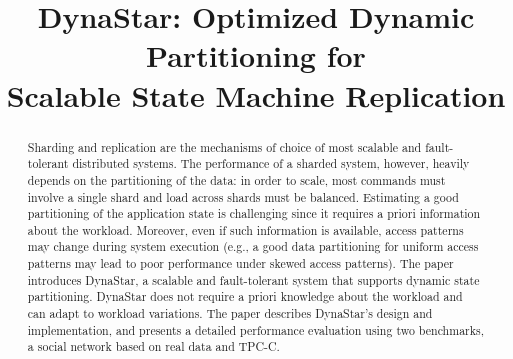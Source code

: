 \documentclass[svgnames,sigplan,10pt]{acmart}
\newcommand{\dynastar}{\mbox{DynaStar}\xspace}
\begin{document}
\title{\dynastar: Optimized Dynamic Partitioning for\\ Scalable State Machine Replication}
\date{}


\begin{abstract}

Sharding and replication are the mechanisms of choice of most scalable and fault-tolerant distributed systems.
The performance of a sharded system, however, heavily depends on the partitioning of the data: in order to scale, most commands must involve a single shard and load across shards must be balanced.
Estimating a good partitioning of the application state is challenging since it requires a priori information about the workload.
Moreover, even if such information is available, access patterns may change during system execution (e.g., a good data partitioning for uniform access patterns may lead to poor performance under skewed access patterns).
The paper introduces DynaStar, a scalable and fault-tolerant system that supports dynamic state partitioning.
DynaStar does not require a priori knowledge about the workload and can adapt to workload variations.
The paper describes DynaStar's design and implementation, and presents a detailed performance evaluation using two benchmarks, a social network based on real data and TPC-C.

\end{abstract}

\maketitle














\end{document}
